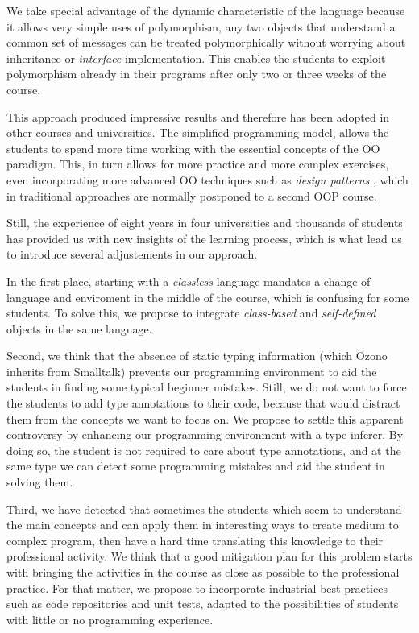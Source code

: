 We take special advantage of the dynamic characteristic of the language because it allows very simple uses of polymorphism, 
\ie any two objects that understand a common set of messages can be treated polymorphically without worrying about inheritance or \emph{interface} implementation.
This enables the students to exploit polymorphism already in their programs after only two or three weeks of the course.

\medskip
This approach produced impressive results and therefore has been adopted in other courses and universities.
The simplified programming model, allows the students to spend more time working with the essential concepts of the OO paradigm.
This, in turn allows for more practice and more complex exercises, even incorporating more advanced OO techniques such as \emph{design patterns} \cite{Gamm03a},
which in traditional approaches are normally postponed to a second OOP course.

Still, the experience of eight years in four universities and thousands of students has provided us with new insights of the learning process, 
which is what lead us to introduce several adjustements in our approach.

In the first place, starting with a \emph{classless} language mandates a change of language and enviroment in the middle of the course,
which is confusing for some students. 
To solve this, we propose to integrate \emph{class-based} and \emph{self-defined} objects in the same language.

Second, we think that the absence of static typing information (which Ozono inherits from Smalltalk) prevents our programming environment to aid the students in finding some typical beginner mistakes.
Still, we do not want to force the students to add type annotations to their code, because that would distract them from the concepts we want to focus on.
We propose to settle this apparent controversy by enhancing our programming environment with a type inferer.
By doing so, the student is not required to care about type annotations, and at the same type we can detect some programming mistakes and aid the student in solving them.

Third, we have detected that sometimes the students which seem to understand the main concepts and can apply them in interesting ways to create medium to complex program, 
then have a hard time translating this knowledge to their professional activity.
We think that a good mitigation plan for this problem starts with bringing the activities in the course as close as possible to the professional practice.
For that matter, we propose to incorporate industrial best practices such as code repositories and unit tests, adapted to the possibilities of students with little or no programming experience.

